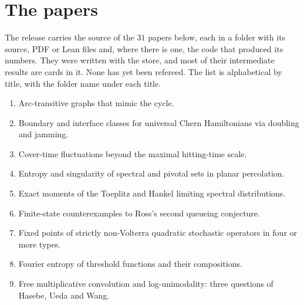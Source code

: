 \section{The papers}\label{app:papers}

The release carries the source of the $31$ papers below, each in a folder  with its source, PDF or Lean files and, where there is one, the code that produced its numbers. They were written with the store, and most of their intermediate results are cards in it. None has yet been refereed. The list is alphabetical by title, with the folder name under each title.

\begin{enumerate}[label=\arabic*., itemsep=3pt, leftmargin=2.2em]
\item Arc-transitive graphs that mimic the cycle.\\ 
\item Boundary and interface classes for universal Chern Hamiltonians via doubling and jamming.\\ 
\item Cover-time fluctuations beyond the maximal hitting-time scale.\\ 
\item Entropy and singularity of spectral and pivotal sets in planar percolation.\\ 
\item Exact moments of the Toeplitz and Hankel limiting spectral distributions.\\ 
\item Finite-state counterexamples to Ross's second queueing conjecture.\\ 
\item Fixed points of strictly non-Volterra quadratic stochastic operators in four or more types.\\ 
\item Fourier entropy of threshold functions and their compositions.\\ 
\item Free multiplicative convolution and log-unimodality: three questions of Hasebe, Ueda and Wang.\\ 

\end{enumerate}
